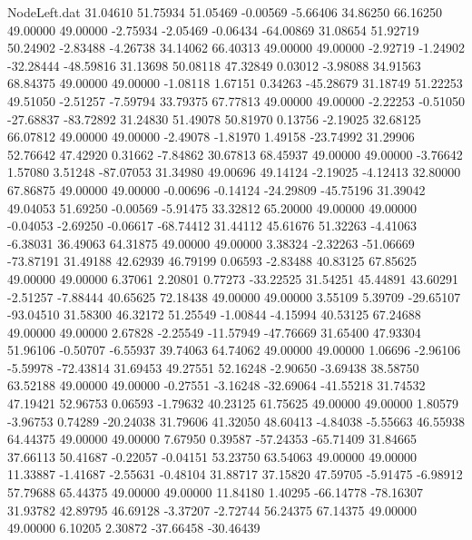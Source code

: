\begin{filecontents}{NodeLeft.dat}
  31.04610   51.75934   51.05469    -0.00569   -5.66406   34.86250   66.16250   49.00000   49.00000   -2.75934   -2.05469   -0.06434  -64.00869
  31.08654   51.92719   50.24902    -2.83488   -4.26738   34.14062   66.40313   49.00000   49.00000   -2.92719   -1.24902  -32.28444  -48.59816
  31.13698   50.08118   47.32849     0.03012   -3.98088   34.91563   68.84375   49.00000   49.00000   -1.08118    1.67151    0.34263  -45.28679
  31.18749   51.22253   49.51050    -2.51257   -7.59794   33.79375   67.77813   49.00000   49.00000   -2.22253   -0.51050  -27.68837  -83.72892
  31.24830   51.49078   50.81970     0.13756   -2.19025   32.68125   66.07812   49.00000   49.00000   -2.49078   -1.81970    1.49158  -23.74992
  31.29906   52.76642   47.42920     0.31662   -7.84862   30.67813   68.45937   49.00000   49.00000   -3.76642    1.57080    3.51248  -87.07053
  31.34980   49.00696   49.14124    -2.19025   -4.12413   32.80000   67.86875   49.00000   49.00000   -0.00696   -0.14124  -24.29809  -45.75196
  31.39042   49.04053   51.69250    -0.00569   -5.91475   33.32812   65.20000   49.00000   49.00000   -0.04053   -2.69250   -0.06617  -68.74412
  31.44112   45.61676   51.32263    -4.41063   -6.38031   36.49063   64.31875   49.00000   49.00000    3.38324   -2.32263  -51.06669  -73.87191
  31.49188   42.62939   46.79199     0.06593   -2.83488   40.83125   67.85625   49.00000   49.00000    6.37061    2.20801    0.77273  -33.22525
  31.54251   45.44891   43.60291    -2.51257   -7.88444   40.65625   72.18438   49.00000   49.00000    3.55109    5.39709  -29.65107  -93.04510
  31.58300   46.32172   51.25549    -1.00844   -4.15994   40.53125   67.24688   49.00000   49.00000    2.67828   -2.25549  -11.57949  -47.76669
  31.65400   47.93304   51.96106    -0.50707   -6.55937   39.74063   64.74062   49.00000   49.00000    1.06696   -2.96106   -5.59978  -72.43814
  31.69453   49.27551   52.16248    -2.90650   -3.69438   38.58750   63.52188   49.00000   49.00000   -0.27551   -3.16248  -32.69064  -41.55218
  31.74532   47.19421   52.96753     0.06593   -1.79632   40.23125   61.75625   49.00000   49.00000    1.80579   -3.96753    0.74289  -20.24038
  31.79606   41.32050   48.60413    -4.84038   -5.55663   46.55938   64.44375   49.00000   49.00000    7.67950    0.39587  -57.24353  -65.71409
  31.84665   37.66113   50.41687    -0.22057   -0.04151   53.23750   63.54063   49.00000   49.00000   11.33887   -1.41687   -2.55631   -0.48104
  31.88717   37.15820   47.59705    -5.91475   -6.98912   57.79688   65.44375   49.00000   49.00000   11.84180    1.40295  -66.14778  -78.16307
  31.93782   42.89795   46.69128    -3.37207   -2.72744   56.24375   67.14375   49.00000   49.00000    6.10205    2.30872  -37.66458  -30.46439

\end{filecontents}
